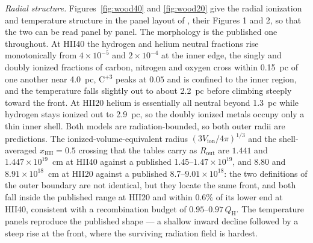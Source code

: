 \documentclass[twocolumn,linenumbers]{aastex702}
\newcommand{\QH}{Q_{\mathrm{H}}}
\begin{document}
\emph{Radial structure.}  Figures~\ref{fig:wood40} and \ref{fig:wood20}
give the radial ionization and temperature structure in the panel layout of
\citet{wood2004}, their Figures 1 and 2, so that the two can be read panel
by panel.  The morphology is the published one throughout.  At HII40 the
hydrogen and helium neutral fractions rise monotonically from
$4\times10^{-5}$ and $2\times10^{-4}$ at the inner edge, the singly and
doubly ionized fractions of carbon, nitrogen and oxygen cross within
0.15~pc of one another near 4.0~pc, C$^{+3}$ peaks at $0.05$ and is
confined to the inner region, and the temperature falls slightly out to
about 2.2~pc before climbing steeply toward the front.  At HII20 helium is
essentially all neutral beyond
1.3~pc while hydrogen stays ionized out to 2.9~pc, so the doubly ionized
metals occupy only a thin inner shell.  Both models are radiation-bounded,
so both outer radii are predictions.  The ionized-volume-equivalent radius
$(3V_{\mathrm{ion}}/4\pi)^{1/3}$ and the shell-averaged
$x_{\mathrm{HII}} = 0.5$ crossing that the tables carry as
$R_{\mathrm{out}}$ are $1.441$ and $1.447\times10^{19}$~cm at HII40 against
a published 1.45--$1.47\times10^{19}$, and $8.80$ and
$8.91\times10^{18}$~cm at HII20 against a published
8.7--$9.01\times10^{18}$: the two definitions of the outer boundary are not
identical, but they locate the same front, and both fall inside the
published range at HII20 and within $0.6\%$ of its lower end at HII40,
consistent with a recombination budget of $0.95$--$0.97\,\QH$.  The temperature panels
reproduce the published shape --- a shallow inward decline followed by a
steep rise at the front, where the surviving radiation field is hardest.
\end{document}
